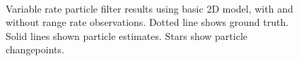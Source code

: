 \documentclass[conference]{IEEEtran}
\begin{document}
\begin{figure}
\centering
{}
\\
\caption{Variable rate particle filter results using basic 2D model, with and without range rate observations. Dotted line shows ground truth. Solid lines shown particle estimates. Stars show particle changepoints.}
\label{fig:2D_Model1}
\end{figure}
\end{document}
